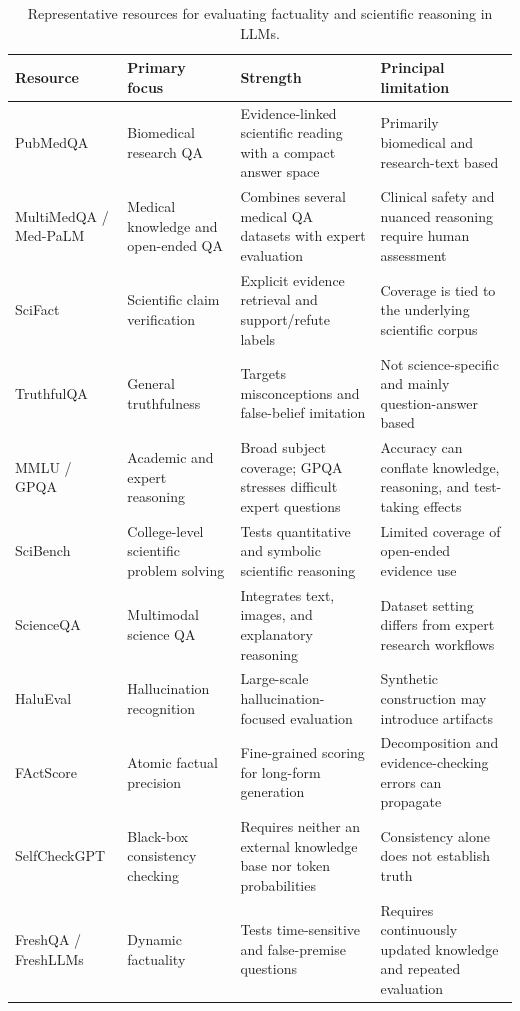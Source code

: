 \documentclass[10pt,a4paper]{article}
\begin{document}
\begin{table}[!htbp]
\centering
\caption{Representative resources for evaluating factuality and scientific reasoning in LLMs.}
\label{tab:benchmarks}
\small
\renewcommand{\arraystretch}{1.08}
\setlength{\tabcolsep}{3.5pt}
\begin{tabularx}{\linewidth}{@{}L{2.0cm} L{2.45cm} Y Y@{}}
\toprule
\textbf{Resource} & \textbf{Primary focus} & \textbf{Strength} & \textbf{Principal limitation} \\
\midrule
PubMedQA & Biomedical research QA & Evidence-linked scientific reading with a compact answer space & Primarily biomedical and research-text based \\
MultiMedQA / Med-PaLM & Medical knowledge and open-ended QA & Combines several medical QA datasets with expert evaluation & Clinical safety and nuanced reasoning require human assessment \\
SciFact & Scientific claim verification & Explicit evidence retrieval and support/refute labels & Coverage is tied to the underlying scientific corpus \\
TruthfulQA & General truthfulness & Targets misconceptions and false-belief imitation & Not science-specific and mainly question-answer based \\
MMLU / GPQA & Academic and expert reasoning & Broad subject coverage; GPQA stresses difficult expert questions & Accuracy can conflate knowledge, reasoning, and test-taking effects \\
SciBench & College-level scientific problem solving & Tests quantitative and symbolic scientific reasoning & Limited coverage of open-ended evidence use \\
ScienceQA & Multimodal science QA & Integrates text, images, and explanatory reasoning & Dataset setting differs from expert research workflows \\
HaluEval & Hallucination recognition & Large-scale hallucination-focused evaluation & Synthetic construction may introduce artifacts \\
FActScore & Atomic factual precision & Fine-grained scoring for long-form generation & Decomposition and evidence-checking errors can propagate \\
SelfCheckGPT & Black-box consistency checking & Requires neither an external knowledge base nor token probabilities & Consistency alone does not establish truth \\
FreshQA / FreshLLMs & Dynamic factuality & Tests time-sensitive and false-premise questions & Requires continuously updated knowledge and repeated evaluation \\
\bottomrule
\end{tabularx}
\end{table}
\end{document}
